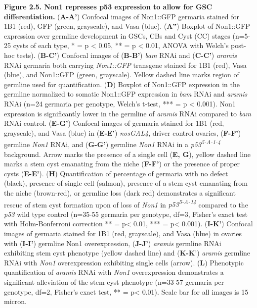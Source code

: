 \documentclass[12pt,twoside]{reedthesis}
\begin{document}
\textbf{Figure 2.5. Non1 represses p53 expression to allow for GSC
differentiation.} (\textbf{A-A'}) Confocal images of Non1::GFP germaria
stained for 1B1 (red), GFP (green, grayscale), and Vasa (blue).
(\textbf{A''}) Boxplot of Non1::GFP expression over germline development in
GSCs, CBs and Cyst (CC) stages (n=5-25 cysts of each type, * = p \textless{}
0.05, ** = p \textless{} 0.01, ANOVA with Welch's post-hoc tests). (\textbf{B-C'})
Confocal images of (\textbf{B-B'}) \emph{bam} RNAi and (\textbf{C-C'}) \emph{aramis} RNAi
germaria both carrying \emph{Non1::GFP} transgene stained for 1B1 (red), Vasa
(blue), and Non1::GFP (green, grayscale). Yellow dashed line marks
region of germline used for quantification. (\textbf{D}) Boxplot of Non1::GFP
expression in the germline normalized to somatic Non1::GFP expression in
\emph{bam} RNAi and \emph{aramis} RNAi (n=24 germaria per genotype, Welch's
t-test, *** = p \textless{} 0.001). Non1 expression is significantly lower in
the germline of \emph{aramis} RNAi compared to \emph{bam} RNAi control. (\textbf{E-G'})
Confocal images of germaria stained for 1B1 (red, grayscale), and Vasa
(blue) in (\textbf{E-E'}) \emph{nosGAL4}, driver control ovaries, (\textbf{F-F'})
germline \emph{Non1} RNAi, and (\textbf{G-G'}) germline \emph{Non1} RNAi in a
\emph{p53\textsuperscript{5-A-1-4}} background. Arrow marks the presence of a single cell
(\textbf{E, G}), yellow dashed line marks a stem cyst emanating from the
niche (\textbf{F-F'}) or the presence of proper cysts (\textbf{E-E'}). (\textbf{H})
Quantification of percentage of germaria with no defect (black),
presence of single cell (salmon), presence of a stem cyst emanating from
the niche (brown-red), or germline loss (dark red) demonstrates a
significant rescue of stem cyst formation upon of loss of \emph{Non1} in
\emph{p53\textsuperscript{5-A-14}} compared to the \emph{p53} wild type control (n=35-55 germaria
per genotype, df=3, Fisher's exact test with Holm-Bonferroni correction
** = p\textless{} 0.01, *** = p\textless{} 0.001). (\textbf{I-K'}) Confocal images of
germaria stained for 1B1 (red, grayscale), and Vasa (blue) in ovaries
with (\textbf{I-I'}) germline Non1 overexpression, (\textbf{J-J'}) \emph{aramis}
germline RNAi exhibiting stem cyst phenotype (yellow dashed line) and
(\textbf{K-K}') \emph{aramis} germline RNAi with \emph{Non1} overexpression exhibiting
single cells (arrow). (\textbf{L}) Phenotypic quantification of \emph{aramis} RNAi
with \emph{Non1} overexpression demonstrates a significant alleviation of the
stem cyst phenotype (n=33-57 germaria per genotype, df=2, Fisher's exact
test, ** = p\textless{} 0.01). Scale bar for all images is 15 micron.
\end{document}
